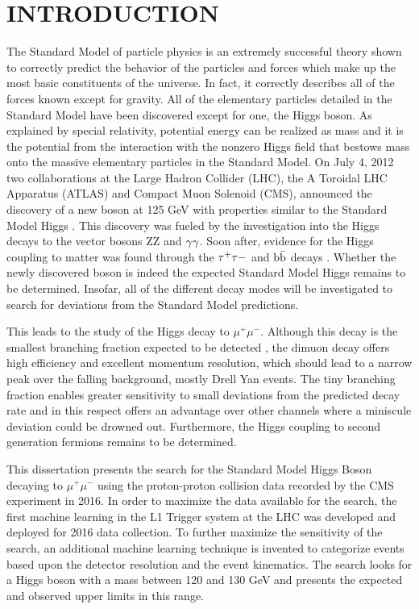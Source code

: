 \chapter{INTRODUCTION} \label{intro}

The Standard Model of particle physics is an extremely successful theory shown to correctly predict the behavior of the particles and forces which make up the most basic constituents of the universe. In fact, it correctly describes all of the forces known except for gravity. All of the elementary particles detailed in the Standard Model have been discovered except for one, the Higgs boson. As explained by special relativity, potential energy can be realized as mass and it is the potential from the interaction with the nonzero Higgs field that bestows mass onto the massive elementary particles in the Standard Model. On July 4, 2012 two collaborations at the Large Hadron Collider (LHC), the A Toroidal LHC Apparatus (ATLAS) and Compact Muon Solenoid (CMS), announced the discovery of a new boson at 125 GeV with properties similar to the Standard Model Higgs \cite{atlasdiscovery,cmsdiscovery2012,cmsdiscovery2013}. This discovery was fueled by the investigation into the Higgs decays to the vector bosons ZZ and ${\rm \gamma\gamma}$. Soon after, evidence for the Higgs coupling to matter was found through the ${\rm \tau^{+}\tau{-}}$ and ${\rm b\bar{b}}$ decays \cite{cmshiggstau,cmshiggsbb,cmshiggsferm,atlashiggsbb}. Whether the newly discovered boson is indeed the expected Standard Model Higgs remains to be determined. Insofar, all of the different decay modes will be investigated to search for deviations from the Standard Model predictions.

This leads to the study of the Higgs decay to $\mu^{+}\mu^{-}$. Although this decay is the smallest branching fraction expected to be detected \cite{smallestbranch1,smallestbranch2}, the dimuon decay offers high efficiency and excellent momentum resolution, which should lead to a narrow peak over the falling background, mostly Drell Yan events. The tiny branching fraction enables greater sensitivity to small deviations from the predicted decay rate and in this respect offers an advantage over other channels where a miniscule deviation could be drowned out. Furthermore, the Higgs coupling to second generation fermions remains to be determined. 

This dissertation presents the search for the Standard Model Higgs Boson decaying to $\mu^{+}\mu^{-}$ using the proton-proton collision data recorded by the CMS experiment in 2016. In order to maximize the data available for the search, the first machine learning in the L1 Trigger system at the LHC was developed and deployed for 2016 data collection. To further maximize the sensitivity of the search, an additional machine learning technique is invented to categorize events based upon the detector resolution and the event kinematics. The search looks for a Higgs boson with a mass between 120 and 130 GeV and presents the expected and observed upper limits in this range. 

